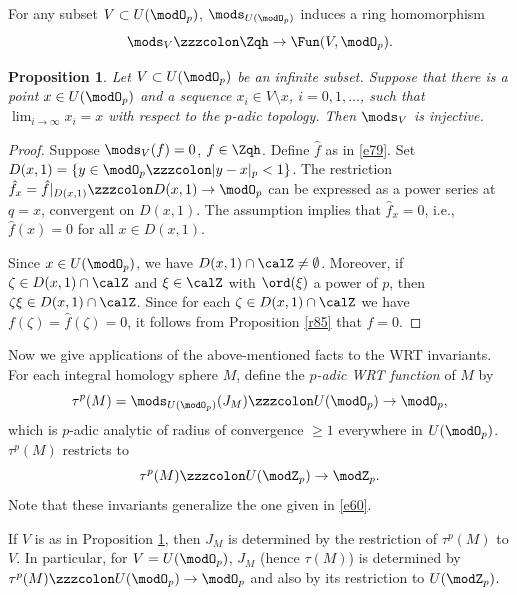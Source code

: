 \documentclass{amsart}
\numberwithin{equation}{section}
\numberwithin{figure}{section}
\theoremstyle{plain}
\newtheorem{proposition}[theorem]{Proposition}
\theoremstyle{definition}
\theoremstyle{remark}
\begin{document}
For any subset $V\subset U(\modO _p)$, $\mods _{U(\modO _p)}$ induces a ring homomorphism
\begin{equation*}
  \mods _V\zzzcolon \Zqh \rightarrow  \Fun(V,\modO _p).
\end{equation*}

\begin{proposition}
  \label{r54}
  Let $V\subset U(\modO _p)$ be an infinite subset.  Suppose that there is a
  point $x\in U(\modO _p)$ and a sequence $x_i\in V\setminus x$, $i=0,1,\ldots$, such that
  $\lim_{i\rightarrow \infty }x_i=x$ with respect to the $p$-adic topology.  Then
  $\mods _V$ is injective.
\end{proposition}

\begin{proof}
  Suppose $\mods _V(f)=0$, $f\in \Zqh$.  Define $\hat{f}$ as in \eqref{e79}.
  Set $D(x,1)=\{y\in \modO _p\zzzcolon |y-x|_p<1\}$.  The restriction $\hat{f}_x=\hat
  f|_{D(x,1)}\zzzcolon D(x,1)\rightarrow \modO _p$ can be expressed as a power series at
  $q=x$, convergent on $D(x,1)$.  The assumption implies that $\hat
  f_x=0$, i.e., $\hat{f}(x)=0$ for all $x\in D(x,1)$.

  Since $x\in U(\modO _p)$, we have $D(x,1)\cap \calZ\neq\emptyset$.  Moreover,
  if $\zeta \in D(x,1)\cap \calZ$ and $\xi \in \calZ$ with $\ord(\xi )$ a power of
  $p$, then $\zeta \xi \in D(x,1)\cap \calZ$.  Since for each $\zeta \in D(x,1)\cap \calZ$
  we have $f(\zeta )=\hat{f}(\zeta )=0$, it follows from Proposition \ref{r85} that
  $f=0$.
\end{proof}

Now we give applications of the above-mentioned facts to the
WRT invariants.  For each integral homology
sphere $M$, define the {\em $p$-adic WRT
function} of $M$ by
\begin{equation}
  \label{e77}
  \tau ^p(M)=\mods _{U(\modO _p)}(J_M)\zzzcolon U(\modO _p)\rightarrow \modO _p,
\end{equation}
which is $p$-adic analytic of radius of convergence $\ge 1$ everywhere
in $U(\modO _p)$.  $\tau ^p(M)$ restricts to
\begin{equation*}
  \tau ^p(M)\zzzcolon U(\modZ _p)\rightarrow \modZ _p.
\end{equation*}
Note that these invariants generalize the one given in \eqref{e60}.

If $V$ is as in Proposition \ref{r54}, then $J_M$ is determined by the
restriction of $\tau ^p(M)$ to $V$.  In particular, for $V=U(\modO _p)$,
$J_M$ (hence $\tau (M)$) is determined by $\tau ^p(M)\zzzcolon U(\modO _p)\rightarrow \modO _p$ and
also by its restriction to $U(\modZ _p)$.
\end{document}
